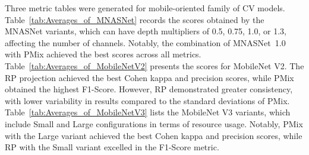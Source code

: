 \documentclass[final,3p,times,twocolumn]{elsarticle}
\begin{document}
Three metric tables were generated for mobile-oriented family of \gls{CV} models.
Table~\ref{tab:Averages_of_MNASNet} records the scores obtained by the MNASNet variants, which can have depth multipliers of 0.5, 0.75, 1.0, or 1.3, affecting the number of channels. Notably, the combination of \mbox{MNASNet 1.0} with \gls{PMix} achieved the best scores across all metrics.
Table~\ref{tab:Averages_of_MobileNetV2} presents the scores for MobileNet V2. The \gls{RP} projection achieved the best Cohen kappa and precision scores, while \gls{PMix} obtained the highest F1-Score. However, \gls{RP} demonstrated greater consistency, with lower variability in results compared to the standard deviations of \gls{PMix}.
Table~\ref{tab:Averages_of_MobileNetV3} lists the MobileNet V3 variants, which include Small and Large configurations in terms of resource usage. Notably, \gls{PMix} with the Large variant achieved the best Cohen kappa and precision scores, while \gls{RP} with the Small variant excelled in the F1-Score metric.
\end{document}

